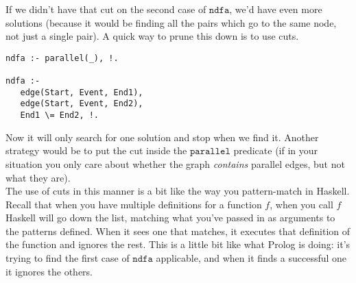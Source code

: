\documentclass[a4paper,12pt]{article}
\newcommand{\kwa}[1]{\mathtt{#1}}
\begin{document}
\noindent
If we didn't have that cut on the second case of $\kwa{ndfa}$, we'd have even more solutions (because it would be finding all the pairs which go to the same node, not just a single pair). A quick way to prune this down is to use cuts.

\begin{lstlisting}
ndfa :- parallel(_), !.

ndfa :-
   edge(Start, Event, End1),
   edge(Start, Event, End2),
   End1 \= End2, !.
\end{lstlisting}

\noindent
Now it will only search for one solution and stop when we find it. Another strategy would be to put the cut inside the $\kwa{parallel}$ predicate (if in your situation you only care about whether the graph \textit{contains} parallel edges, but not what they are). \\

\noindent
The use of cuts in this manner is a bit like the way you pattern-match in Haskell. Recall that when you have multiple definitions for a function $f$, when you call $f$ Haskell will go down the list, matching what you've passed in as arguments to the patterns defined. When it sees one that matches, it executes that definition of the function and ignores the rest. This is a little bit like what Prolog is doing: it's trying to find the first case of $\kwa{ndfa}$ applicable, and when it finds a successful one it ignores the others.
\end{document}
